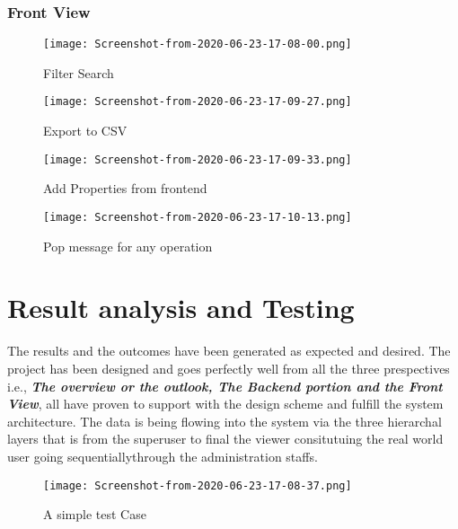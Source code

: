 \documentclass[12pt]{report}
\begin{document}
\subsection{Front View}
\begin{figure}[!htb]
  \centering
  \begin{minipage}[b]{0.4\textwidth}
    \texttt{[image: Screenshot-from-2020-06-23-17-08-00.png]}
    \caption{Filter Search}
  \end{minipage}
  \hfill
  \begin{minipage}[b]{0.4\textwidth}
    \texttt{[image: Screenshot-from-2020-06-23-17-09-27.png]}
    \caption{Export to CSV}
  \end{minipage}
\end{figure}
\begin{figure}[!htb]
  \centering
  \begin{minipage}[b]{0.4\textwidth}
    \texttt{[image: Screenshot-from-2020-06-23-17-09-33.png]}
    \caption{Add Properties from frontend}
  \end{minipage}
  \hfill
  \begin{minipage}[b]{0.4\textwidth}
    \texttt{[image: Screenshot-from-2020-06-23-17-10-13.png]}
    \caption{Pop message for any operation}
  \end{minipage}
\end{figure}

\newpage


\chapter{Result analysis and Testing}

The results and the outcomes have been generated as expected and desired. The project has been designed and goes perfectly well from all the three prespectives i.e., \textbf{\textit{The overview or the outlook, The Backend portion and the Front View}}, all have proven to support with the design scheme and fulfill the system architecture. The data is being flowing into the system via the three hierarchal layers that is from the superuser to final the viewer consitutuing the real world user going sequentiallythrough the administration staffs.

\begin{figure}[!htb]
\texttt{[image: Screenshot-from-2020-06-23-17-08-37.png]}
\centering
\caption{A simple test Case}

\end{figure}
\end{document}
